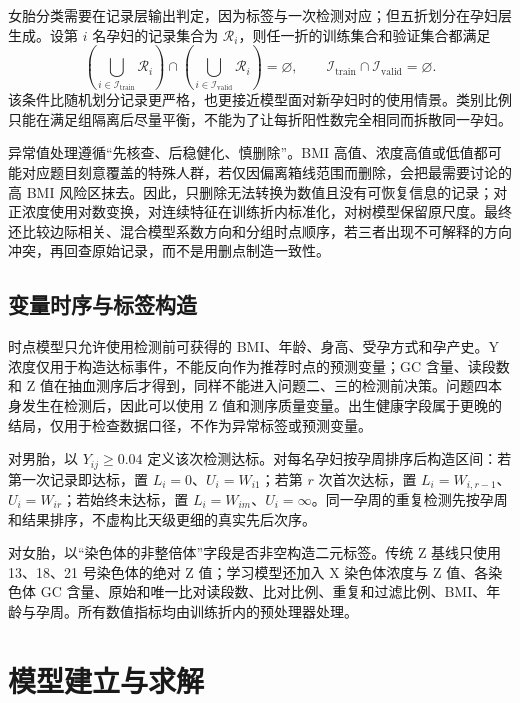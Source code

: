 \documentclass[UTF8,a4paper,12pt]{ctexart}
\begin{document}
女胎分类需要在记录层输出判定，因为标签与一次检测对应；但五折划分在孕妇层生成。设第 $i$ 名孕妇的记录集合为 $\mathcal R_i$，则任一折的训练集合和验证集合都满足
\begin{equation}
\left(\bigcup_{i\in\mathcal I_{\mathrm{train}}}\mathcal R_i\right)
\cap
\left(\bigcup_{i\in\mathcal I_{\mathrm{valid}}}\mathcal R_i\right)=\varnothing,
\qquad
\mathcal I_{\mathrm{train}}\cap\mathcal I_{\mathrm{valid}}=\varnothing.
\label{eq:groupsplit}
\end{equation}
该条件比随机划分记录更严格，也更接近模型面对新孕妇时的使用情景。类别比例只能在满足组隔离后尽量平衡，不能为了让每折阳性数完全相同而拆散同一孕妇。

异常值处理遵循“先核查、后稳健化、慎删除”。BMI 高值、浓度高值或低值都可能对应题目刻意覆盖的特殊人群，若仅因偏离箱线范围而删除，会把最需要讨论的高 BMI 风险区抹去。因此，只删除无法转换为数值且没有可恢复信息的记录；对正浓度使用对数变换，对连续特征在训练折内标准化，对树模型保留原尺度。最终还比较边际相关、混合模型系数方向和分组时点顺序，若三者出现不可解释的方向冲突，再回查原始记录，而不是用删点制造一致性。

\subsection{变量时序与标签构造}

时点模型只允许使用检测前可获得的 BMI、年龄、身高、受孕方式和孕产史。Y 浓度仅用于构造达标事件，不能反向作为推荐时点的预测变量；GC 含量、读段数和 Z 值在抽血测序后才得到，同样不能进入问题二、三的检测前决策。问题四本身发生在检测后，因此可以使用 Z 值和测序质量变量。出生健康字段属于更晚的结局，仅用于检查数据口径，不作为异常标签或预测变量。

对男胎，以 $Y_{ij}\ge0.04$ 定义该次检测达标。对每名孕妇按孕周排序后构造区间：若第一次记录即达标，置 $L_i=0$、$U_i=W_{i1}$；若第 $r$ 次首次达标，置 $L_i=W_{i,r-1}$、$U_i=W_{ir}$；若始终未达标，置 $L_i=W_{im}$、$U_i=\infty$。同一孕周的重复检测先按孕周和结果排序，不虚构比天级更细的真实先后次序。

对女胎，以“染色体的非整倍体”字段是否非空构造二元标签。传统 Z 基线只使用 13、18、21 号染色体的绝对 Z 值；学习模型还加入 X 染色体浓度与 Z 值、各染色体 GC 含量、原始和唯一比对读段数、比对比例、重复和过滤比例、BMI、年龄与孕周。所有数值指标均由训练折内的预处理器处理。

\section{模型建立与求解}
\end{document}
